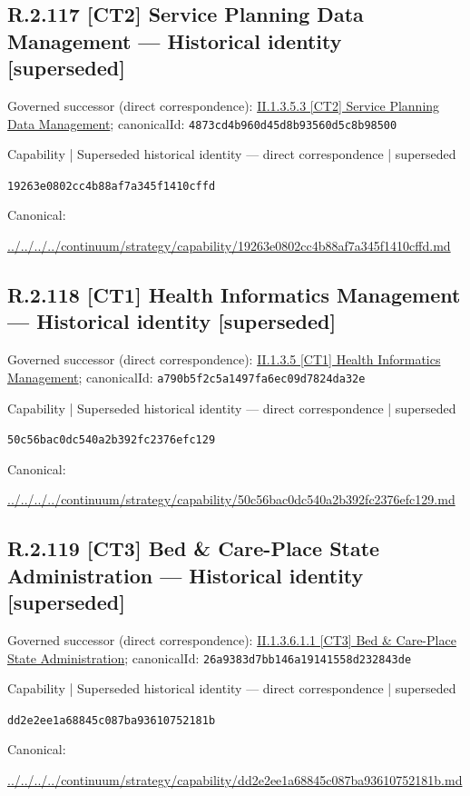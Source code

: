 \documentclass[10pt,a4paper]{article}
\begin{document}
\subsection*{R.2.117 [CT2] Service Planning Data Management — Historical identity [superseded]}
Governed successor (direct correspondence): \hyperref[element-4873cd4b960d45d8b93560d5c8b98500]{II.1.3.5.3 [CT2] Service Planning Data Management}; canonicalId: \texttt{4873cd4b960d45d8b93560d5c8b98500}\par
\label{element-19263e0802cc4b88af7a345f1410cffd}
{\small Capability | Superseded historical identity — direct correspondence | superseded}\par
\texttt{19263e0802cc4b88af7a345f1410cffd}\par
Canonical: \par
{\footnotesize\url{../../../../continuum/strategy/capability/19263e0802cc4b88af7a345f1410cffd.md}}\par
\subsection*{R.2.118 [CT1] Health Informatics Management — Historical identity [superseded]}
Governed successor (direct correspondence): \hyperref[element-a790b5f2c5a1497fa6ec09d7824da32e]{II.1.3.5 [CT1] Health Informatics Management}; canonicalId: \texttt{a790b5f2c5a1497fa6ec09d7824da32e}\par
\label{element-50c56bac0dc540a2b392fc2376efc129}
{\small Capability | Superseded historical identity — direct correspondence | superseded}\par
\texttt{50c56bac0dc540a2b392fc2376efc129}\par
Canonical: \par
{\footnotesize\url{../../../../continuum/strategy/capability/50c56bac0dc540a2b392fc2376efc129.md}}\par
\subsection*{R.2.119 [CT3] Bed \& Care-Place State Administration — Historical identity [superseded]}
Governed successor (direct correspondence): \hyperref[element-26a9383d7bb146a19141558d232843de]{II.1.3.6.1.1 [CT3] Bed \& Care-Place State Administration}; canonicalId: \texttt{26a9383d7bb146a19141558d232843de}\par
\label{element-dd2e2ee1a68845c087ba93610752181b}
{\small Capability | Superseded historical identity — direct correspondence | superseded}\par
\texttt{dd2e2ee1a68845c087ba93610752181b}\par
Canonical: \par
{\footnotesize\url{../../../../continuum/strategy/capability/dd2e2ee1a68845c087ba93610752181b.md}}\par
\end{document}
